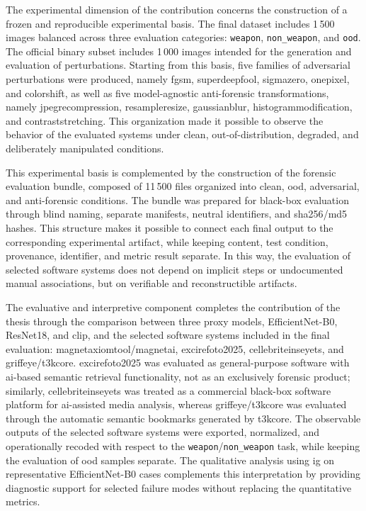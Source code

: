 The experimental dimension of the contribution concerns the construction of a
frozen and reproducible experimental basis. The final dataset includes 1\,500
images balanced across three evaluation categories: \texttt{weapon},
\texttt{non\_weapon}, and \texttt{ood}. The official binary subset includes
1\,000 images intended for the generation and evaluation of perturbations.
Starting from this basis, five families of adversarial perturbations were
produced, namely \gls{fgsm}, \gls{superdeepfool}, \gls{sigmazero},
\gls{onepixel}, and \gls{colorshift}, as well as five model-agnostic
anti-forensic transformations, namely \gls{jpegrecompression},
\gls{resampleresize}, \gls{gaussianblur}, \gls{histogrammodification}, and
\gls{contraststretching}. This organization made it possible to observe the
behavior of the evaluated systems under clean, out-of-distribution, degraded,
and deliberately manipulated conditions.

This experimental basis is complemented by the construction of the forensic
evaluation bundle, composed of 11\,500 files organized into clean, \gls{ood},
adversarial, and anti-forensic conditions. The bundle was prepared for
black-box evaluation through blind naming, separate manifests, neutral
identifiers, and \gls{sha256}/\gls{md5} hashes. This structure makes it
possible to connect each final output to the corresponding experimental
artifact, while keeping content, test condition, provenance, identifier, and
metric result separate. In this way, the evaluation of selected software systems
does not depend on implicit steps or undocumented manual associations, but on
verifiable and reconstructible artifacts.

The evaluative and interpretive component completes the contribution of the
thesis through the comparison between three proxy models, EfficientNet-B0,
ResNet18, and \gls{clip}, and the selected software systems included in the
final evaluation: \gls{magnetaxiomtool}/\gls{magnetai},
\gls{excirefoto2025}, \gls{cellebriteinseyets}, and
\gls{griffeye}/\gls{t3kcore}. \gls{excirefoto2025} was evaluated as
general-purpose software with \gls{ai}-based semantic retrieval functionality,
not as an exclusively forensic product; similarly, \gls{cellebriteinseyets} was
treated as a commercial black-box software platform for \gls{ai}-assisted media
analysis, whereas \gls{griffeye}/\gls{t3kcore} was evaluated through the
automatic semantic bookmarks generated by \gls{t3kcore}. The observable outputs
of the selected software systems were exported, normalized, and operationally
recoded with respect to the \texttt{weapon}/\texttt{non\_weapon} task, while
keeping the evaluation of \gls{ood} samples separate. The qualitative analysis
using \gls{ig} on representative EfficientNet-B0 cases complements this
interpretation by providing diagnostic support for selected failure modes
without replacing the quantitative metrics.

